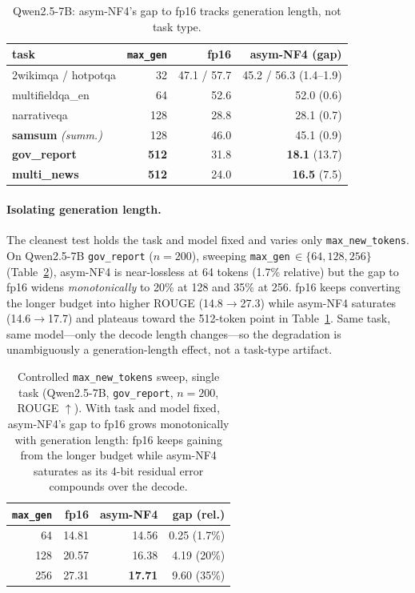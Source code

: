 \documentclass[11pt]{article}
\newcommand{\collapse}[1]{\textcolor{collapse}{\textbf{#1}}}
\begin{document}
\begin{table}[h]
\centering\small
\caption{Qwen2.5-7B: asym-NF4's gap to fp16 tracks generation length, not task type.}
\label{tab:longgen}
\begin{tabular}{lrrr}
\toprule
task & \texttt{max\_gen} & fp16 & asym-NF4 (gap) \\
\midrule
2wikimqa / hotpotqa & 32 & 47.1 / 57.7 & 45.2 / 56.3 \;(1.4--1.9) \\
multifieldqa\_en & 64 & 52.6 & 52.0 \;(0.6) \\
narrativeqa & 128 & 28.8 & 28.1 \;(0.7) \\
\textbf{samsum} \emph{(summ.)} & 128 & 46.0 & 45.1 \;(0.9) \\
\textbf{gov\_report} & \textbf{512} & 31.8 & \collapse{18.1} \;(13.7) \\
\textbf{multi\_news} & \textbf{512} & 24.0 & \collapse{16.5} \;(7.5) \\
\bottomrule
\end{tabular}
\end{table}

\paragraph{Isolating generation length.} The cleanest test holds the task and model
fixed and varies only \texttt{max\_new\_tokens}. On Qwen2.5-7B \texttt{gov\_report}
($n=200$), sweeping \texttt{max\_gen}$\,\in\{64,128,256\}$ (Table~\ref{tab:mgsweep}),
asym-NF4 is near-lossless at 64 tokens (1.7\% relative) but the gap to fp16 widens
\emph{monotonically} to 20\% at 128 and 35\% at 256. fp16 keeps converting the longer
budget into higher ROUGE (14.8$\rightarrow$27.3) while asym-NF4 saturates
(14.6$\rightarrow$17.7) and plateaus toward the 512-token point in
Table~\ref{tab:longgen}. Same task, same model---only the decode length changes---so the
degradation is unambiguously a generation-length effect, not a task-type artifact.

\begin{table}[h]
\centering\small
\caption{Controlled \texttt{max\_new\_tokens} sweep, single task (Qwen2.5-7B,
\texttt{gov\_report}, $n=200$, ROUGE $\uparrow$). With task and model fixed, asym-NF4's gap
to fp16 grows monotonically with generation length: fp16 keeps gaining from the longer
budget while asym-NF4 saturates as its 4-bit residual error compounds over the decode.}
\label{tab:mgsweep}
\begin{tabular}{rrrr}
\toprule
\texttt{max\_gen} & fp16 & \textbf{asym-NF4} & gap (rel.) \\
\midrule
64  & 14.81 & 14.56 & 0.25 \;(1.7\%) \\
128 & 20.57 & 16.38 & 4.19 \;(20\%) \\
256 & 27.31 & \collapse{17.71} & 9.60 \;(35\%) \\
\bottomrule
\end{tabular}
\end{table}
\end{document}
